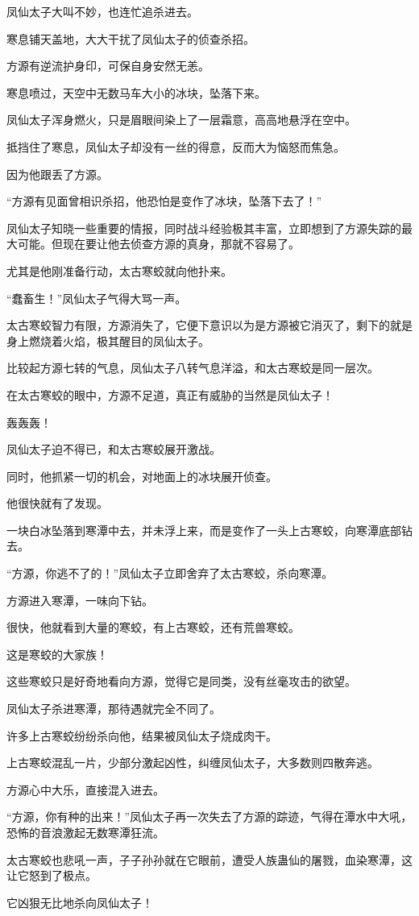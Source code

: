 \begin{this_body}
凤仙太子大叫不妙，也连忙追杀进去。

寒息铺天盖地，大大干扰了凤仙太子的侦查杀招。

方源有逆流护身印，可保自身安然无恙。

寒息喷过，天空中无数马车大小的冰块，坠落下来。

凤仙太子浑身燃火，只是眉眼间染上了一层霜意，高高地悬浮在空中。

抵挡住了寒息，凤仙太子却没有一丝的得意，反而大为恼怒而焦急。

因为他跟丢了方源。

“方源有见面曾相识杀招，他恐怕是变作了冰块，坠落下去了！”

凤仙太子知晓一些重要的情报，同时战斗经验极其丰富，立即想到了方源失踪的最大可能。但现在要让他去侦查方源的真身，那就不容易了。

尤其是他刚准备行动，太古寒蛟就向他扑来。

“蠢畜生！”凤仙太子气得大骂一声。

太古寒蛟智力有限，方源消失了，它便下意识以为是方源被它消灭了，剩下的就是身上燃烧着火焰，极其醒目的凤仙太子。

比较起方源七转的气息，凤仙太子八转气息洋溢，和太古寒蛟是同一层次。

在太古寒蛟的眼中，方源不足道，真正有威胁的当然是凤仙太子！

轰轰轰！

凤仙太子迫不得已，和太古寒蛟展开激战。

同时，他抓紧一切的机会，对地面上的冰块展开侦查。

他很快就有了发现。

一块白冰坠落到寒潭中去，并未浮上来，而是变作了一头上古寒蛟，向寒潭底部钻去。

“方源，你逃不了的！”凤仙太子立即舍弃了太古寒蛟，杀向寒潭。

方源进入寒潭，一味向下钻。

很快，他就看到大量的寒蛟，有上古寒蛟，还有荒兽寒蛟。

这是寒蛟的大家族！

这些寒蛟只是好奇地看向方源，觉得它是同类，没有丝毫攻击的欲望。

凤仙太子杀进寒潭，那待遇就完全不同了。

许多上古寒蛟纷纷杀向他，结果被凤仙太子烧成肉干。

上古寒蛟混乱一片，少部分激起凶性，纠缠凤仙太子，大多数则四散奔逃。

方源心中大乐，直接混入进去。

“方源，你有种的出来！”凤仙太子再一次失去了方源的踪迹，气得在潭水中大吼，恐怖的音浪激起无数寒潭狂流。

太古寒蛟也悲吼一声，子子孙孙就在它眼前，遭受人族蛊仙的屠戮，血染寒潭，这让它怒到了极点。

它凶狠无比地杀向凤仙太子！

\end{this_body}

